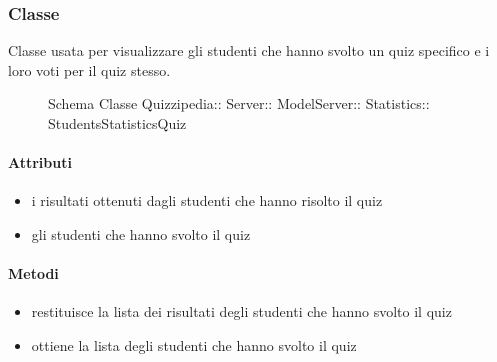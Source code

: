 \subsubsection{Classe }
Classe usata per visualizzare gli studenti che hanno svolto un quiz specifico e i loro voti per il quiz stesso.
\begin{figure}[H]
\centering
\noindent{}
\caption[Schema Classe StudentsStatisticsQuiz]{Schema Classe Quizzipedia:: Server:: ModelServer:: Statistics:: StudentsStatisticsQuiz}
\end{figure}
\paragraph{Attributi}
\begin{itemize}
\item {}
\newline
i risultati ottenuti dagli studenti che hanno risolto il quiz
\item {}
\newline
gli studenti che hanno svolto il quiz
\end{itemize}
\paragraph{Metodi}
\begin{itemize}
\item {}
\newline
restituisce la lista dei risultati degli studenti che hanno svolto il quiz
\newline
\item {}
\newline
ottiene la lista degli studenti che hanno svolto il quiz
\newline
\end{itemize}
